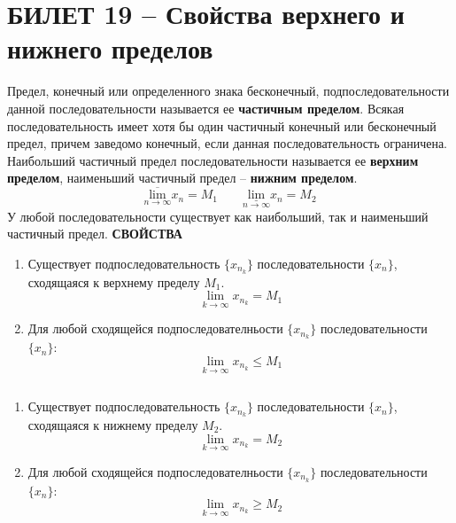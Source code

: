 \documentclass{article}
\begin{document}
\section{БИЛЕТ 19 -- Свойства верхнего и нижнего пределов}
Предел, конечный или определенного знака
бесконечный, подпоследовательности данной
последовательности называется ее \textbf{частичным пределом}.
\newline
\newline
Всякая последовательность имеет хотя бы один
частичный конечный или бесконечный предел, причем
заведомо конечный, если данная последовательность
ограничена.
\newline
\newline
Наибольший частичный предел последовательности
называется ее \textbf{верхним пределом}, наименьший частичный предел -- \textbf{нижним пределом}.
$$ \underset{n\to\infty}{\overline{\text{lim} }}x_{n}=M_{1}\qquad \underset{n\to\infty}{\underline{\text{lim} }}x_{n}=M_{2} $$
\newline
У любой последовательности существует как наибольший, так и наименьший частичный предел.
\newline
\newline
\textbf{СВОЙСТВА}
\begin{enumerate}
    \item Существует подпоследовательность $\{x_{n_{k}}\}$ последовательности $\{x_{n}\}$, сходящаяся к верхнему пределу $M_{1}$.
    $$ \lim_{k\to\infty}x_{n_{k}}=M_{1}$$
    \item Для любой сходящейся подпоследователньости $\{x_{n_{k}}\}$ последовательности $\{x_{n}\}$:
    $$ \lim_{k\to\infty}x_{n_{k}}\leqslant M_{1} $$
\end{enumerate}
$$ $$
\begin{enumerate}
    \item Существует подпоследовательность $\{x_{n_{k}}\}$ последовательности $\{x_{n}\}$, сходящаяся к нижнему пределу $M_{2}$.
    $$ \lim_{k\to\infty}x_{n_{k}}=M_{2}  $$
    \item Для любой сходящейся подпоследователньости $\{x_{n_{k}}\}$ последовательности $\{x_{n}\}$:
    $$ \lim_{k\to\infty}x_{n_{k}}\geqslant M_{2} $$
\end{enumerate}
\newpage
\end{document}
